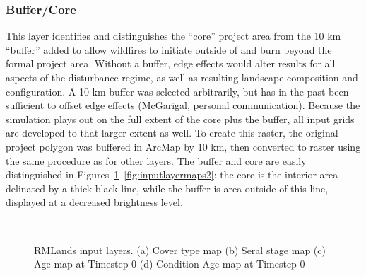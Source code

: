 \subsubsection{Buffer/Core} 
This layer identifies and distinguishes the ``core'' project area from the 10 km ``buffer'' added to allow wildfires to initiate outside of and burn beyond the formal project area. Without a buffer, edge effects would alter results for all aspects of the disturbance regime, as well as resulting landscape composition and configuration. A 10 km buffer was selected arbitrarily, but has in the past been sufficient to offset edge effects (McGarigal, personal communication). Because the simulation plays out on the full extent of the core plus the buffer, all input grids are developed to that larger extent as well. To create this raster, the original project polygon was buffered in ArcMap by 10 km, then converted to raster using the same procedure as for other layers. The buffer and core are easily distinguished in Figures~\ref{fig:inputlayermaps1}--\ref{fig:inputlayermaps2}: the core is the interior area delinated by a thick black line, while the buffer is area outside of this line, displayed at a decreased brightness level.

\begin{figure}[!htbp]
  \centering
   \qquad
   \\
	 \qquad

  \caption{RMLands input layers. (a) Cover type map (b) Seral stage map (c) Age map at Timestep 0 (d) Condition-Age map at Timestep 0 }
  \label{fig:inputlayermaps1}
\end{figure}

